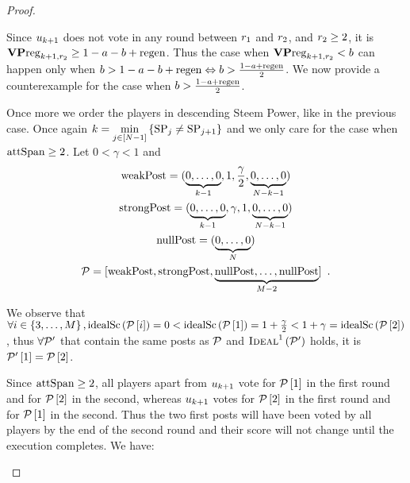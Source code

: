 \documentclass[a4paper,english,cleveref, autoref]{oasics-v2019}
\begin{document}
\begin{subappendices}
\begin{proof}
\begin{itemize}
    Since $u_{k+1}$ does not vote in any round between $r_1$ and
    $r_2$, and $r_2 \geq 2$, it is $\mathrm{\textbf{VP}reg}_{k+1, r_2} \geq 1 -
    a - b + \mathrm{regen}$. Thus the case when $\mathrm{\textbf{VP}reg}_{k+1, r_2} < b$ can
    happen only when $b > 1 - a - b + \mathrm{regen} \Leftrightarrow b > \frac{1 - a +
    \mathrm{regen}}{2}$. We now provide a counterexample for the case when $b > \frac{1
    - a + \mathrm{regen}}{2}$.

    Once more we order the players in descending Steem Power, like in the
    previous case. Once again $k = \min\limits_{j \in \left[N -
    1\right]}\left\{\mathrm{SP}_j \neq \mathrm{SP}_{j+1}\right\}$ and we only care for the
    case when $\mathrm{attSpan} \geq 2$. Let $0 < \gamma < 1$ and
    \begin{gather*}
      \mathrm{weakPost} = (\underbrace{0, \dots, 0}_{k - 1}, 1, \frac{\gamma}{2},
      \underbrace{0, \dots, 0}_{N - k - 1}) \\
      \mathrm{strongPost} = (\underbrace{0, \dots, 0}_{k - 1}, \gamma, 1, \underbrace{0,
      \dots, 0}_{N - k - 1}) \\
      \mathrm{nullPost} = (\underbrace{0, \dots, 0}_{N}) \\
      \mathcal{P} = [\mathrm{weakPost}, \mathrm{strongPost}, \underbrace{\mathrm{nullPost}, \dots,
      \mathrm{nullPost}}_{M - 2}] \enspace.
    \end{gather*}

    We observe that $\forall i \in \left\{3, \dots, M\right\},
    \mathrm{idealSc}\left(\mathcal{P}\left[i\right]\right) = 0 < \mathrm{idealSc}\left(\mathcal{P}\left[1\right]\right) = 1 +
    \frac{\gamma}{2} < 1 + \gamma = \mathrm{idealSc}\left(\mathcal{P}\left[2\right]\right)$, thus
    $\forall \mathcal{P}'$ that contain the same posts as $\mathcal{P}$ and
    $\textsc{Ideal}^1\left(\mathcal{P}'\right)$ holds, it is
    $\mathcal{P}'\left[1\right] = \mathcal{P}\left[2\right]$.

    Since $\mathrm{attSpan} \geq 2$, all players apart from $u_{k + 1}$ vote for
    $\mathcal{P}\left[1\right]$ in the first round and for
    $\mathcal{P}\left[2\right]$ in the second, whereas $u_{k + 1}$ votes for
    $\mathcal{P}\left[2\right]$ in the first round and for
    $\mathcal{P}\left[1\right]$ in the second. Thus the two first posts will have
    been voted by all players by the end of the second round and their score
    will not change until the execution completes. We have:


\end{itemize}
\end{proof}
\end{subappendices}
\end{document}
